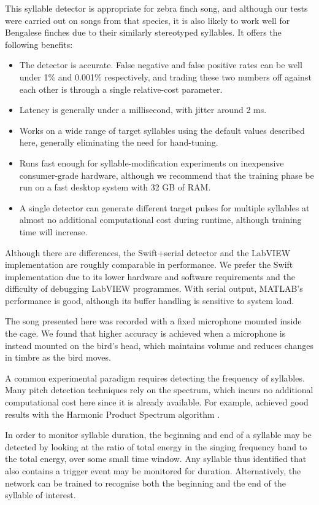 \documentclass[10pt,letterpaper]{article}
\begin{document}
This syllable detector is appropriate for zebra finch song, and
although our tests were carried out on songs from that species, it is
also likely to work well for Bengalese finches due to their similarly stereotyped syllables.  It offers the
following benefits:
\begin{itemize}
\item The detector is accurate. False negative and false positive
  rates can be well under 1\% and 0.001\% respectively, and trading
  these two numbers off against each other is through a single
  relative-cost parameter.
\item Latency is generally under a millisecond, with jitter around 2
  ms.
\item Works on a wide range of target syllables using the default
  values described here, generally eliminating the need for
  hand-tuning.
\item Runs fast enough for syllable-modification experiments on
  inexpensive consumer-grade hardware, although we recommend that the
  training phase be run on a fast desktop system with 32 GB of RAM.
\item A single detector can generate different target pulses for
  multiple syllables at almost no additional computational cost during
  runtime, although training time will increase.
\end{itemize}

Although there are differences, the Swift+serial detector and the
LabVIEW implementation are roughly comparable in performance.  We
prefer the Swift implementation due to its lower hardware and software
requirements and the difficulty of debugging LabVIEW programmes.  With
serial output, MATLAB's performance is good, although its buffer
handling is sensitive to system load.

The song presented here was recorded with a fixed microphone mounted
inside the cage.  We found that higher accuracy is achieved when a
microphone is instead mounted on the bird's head, which maintains
volume and reduces changes in timbre as the bird moves.

A common experimental paradigm requires detecting the frequency of
syllables.  Many pitch detection techniques rely on the spectrum,
which incurs no additional computational cost here since it is already
available.  For example, \cite{Canopoli2014} achieved good results
with the Harmonic Product Spectrum algorithm
\cite{Noll1970pitchdetection}.

In order to monitor syllable duration, the beginning and end of a
syllable may be detected by looking at the ratio of total energy in
the singing frequency band to the total energy, over some small time
window.  Any syllable thus identified that also contains a trigger
event may be monitored for duration.  Alternatively, the network can
be trained to recognise both the beginning and the end of the syllable
of interest.
\end{document}
